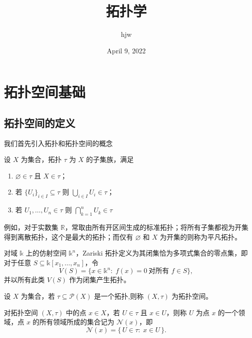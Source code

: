 \documentclass[lang=cn,a4paper,newtx,figureplace=section,tableplace=section]{elegantbook}
\title{拓扑学}
\author{hjw}
\date{April 9, 2022}
\begin{document}
\maketitle
\frontmatter

\tableofcontents

\mainmatter

\chapter{拓扑空间基础}

\section{拓扑空间的定义}

我们首先引入拓扑和拓扑空间的概念
\begin{definition}[拓扑]\label{def:topology}
设 $X$ 为集合，拓扑 $\tau$ 为 $X$ 的子集族，满足
\begin{enumerate}
\item $\varnothing\in\tau$ 且 $X\in\tau$；
\item 若 $\{U_i\}_{i\in I}\subseteq\tau$ 则 $\bigcup_{i\in I}U_i\in\tau$；
\item 若 $U_1,\dots,U_n\in\tau$ 则 $\bigcap_{k=1}^n U_k\in\tau$
\end{enumerate}
\end{definition}

例如，对于实数集 $\mathbb{R}$，常取由所有开区间生成的标准拓扑；将所有子集都视为开集得到离散拓扑，这个是最大的拓扑；而仅有 $\varnothing$ 和 $X$ 为开集的则称为平凡拓扑。

\begin{example}[Zariski 拓扑]\label{def:zariski} 对域 $\mathbb{k}$ 上的仿射空间 $\mathbb{k}^n$，Zariski 拓扑定义为其闭集恰为多项式集合的零点集，即对于任意 $S\subseteq\mathbb{k}[x_1,\dots,x_n]$，令 \begin{equation} 
V(S)=\{x\in\mathbb{k}^n:\; f(x)=0\ \text{对所有 }f\in S\}, 
\end{equation} 并以所有此类 $V(S)$ 作为闭集产生拓扑。 
\end{example}

\begin{definition}[拓扑空间]\label{def:topological_space}
设 $X$ 为集合，若 $\tau\subseteq\mathcal{P}(X)$ 是一个拓扑,则称 $(X,\tau)$ 为拓扑空间。 
\end{definition}

\begin{definition}[邻域]\label{def:neighborhood} 对拓扑空间 $(X,\tau)$ 中的点 $x\in X$，若 $U\in\tau$ 且 $x\in U$，则称 $U$ 为点 $x$ 的一个领域，点 $x$ 的所有领域所成的集合记为 $\mathcal{N}(x)$，即 \begin{equation} \mathcal{N}(x)=\{\,U\in\tau:\; x\in U\,\}. \end{equation} \end{definition}
\end{document}
